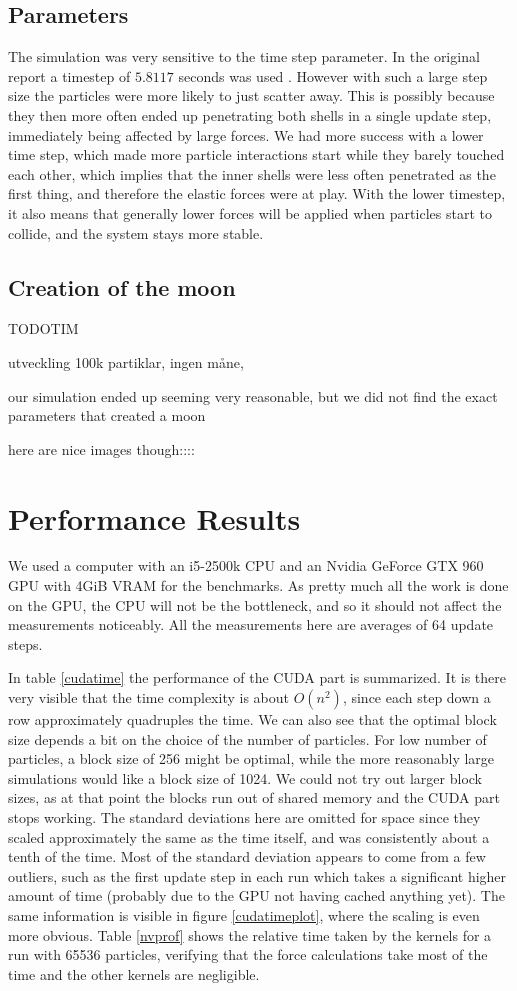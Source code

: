 \documentclass[a4paper]{article}
\begin{document}
\subsection{Parameters}
The simulation was very sensitive to the time step parameter. 
In the original report a timestep of $5.8117$ seconds was used \cite{simulation_paper}. 
However with such a large step size the particles were more likely to just scatter away. 
This is possibly because they then more often ended up penetrating both shells in a single update step, immediately being affected by large forces.
We had more success with a lower time step, which made more particle interactions start while they barely touched each other, which implies that the inner shells were less often penetrated as the first thing, and therefore the elastic forces were at play.
With the lower timestep, it also means that generally lower forces will be applied when particles start to collide, and the system stays more stable.

\subsection{Creation of the moon}
TODOTIM 

utveckling 100k partiklar, ingen måne, 

our simulation ended up seeming very reasonable, but we did not find the exact parameters that created a moon

here are nice images though::::


\section{Performance Results}
We used a computer with an i5-2500k CPU and an Nvidia GeForce GTX 960 GPU with 4GiB VRAM for the benchmarks.
As pretty much all the work is done on the GPU, the CPU will not be the bottleneck, and so it should not affect the measurements noticeably.
All the measurements here are averages of 64 update steps.

In table \ref{cudatime} the performance of the CUDA part is summarized.
It is there very visible that the time complexity is about $O(n^2)$, since each step down a row approximately quadruples the time.
We can also see that the optimal block size depends a bit on the choice of the number of particles.
For low number of particles, a block size of 256 might be optimal, while the more reasonably large simulations would like a block size of 1024.
We could not try out larger block sizes, as at that point the blocks run out of shared memory and the CUDA part stops working.
The standard deviations here are omitted for space since they scaled approximately the same as the time itself, and was consistently about a tenth of the time.
Most of the standard deviation appears to come from a few outliers, such as the first update step in each run which takes a significant higher amount of time (probably due to the GPU not having cached anything yet).
The same information is visible in figure \ref{cudatimeplot}, where the scaling is even more obvious.
Table \ref{nvprof} shows the relative time taken by the kernels for a run with 65536 particles, verifying that the force calculations take most of the time and the other kernels are negligible.
\end{document}
